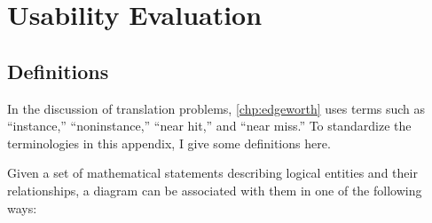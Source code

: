 \chapter{\Edgeworth{} Usability Evaluation}

\section{Definitions}
\label{sec:definitions}

In the discussion of translation problems, \cref{chp:edgeworth} uses terms such as ``instance,'' ``noninstance,'' ``near hit,'' and ``near miss.'' To standardize the terminologies in this appendix, I give some definitions here.

Given a set of mathematical statements describing logical entities and their relationships, a diagram can be associated with them in one of the following ways:

